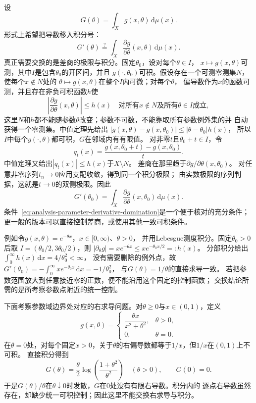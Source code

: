 设
\[   G(\theta)=\int_X g(x,\theta)\,\mathrm{d}\mu(x). \]
形式上希望把导数移入积分号：
\[   G'(\theta)   \stackrel{?}{=}   \int_X\frac{\partial g}{\partial\theta}(x,\theta)\,\mathrm{d}\mu(x). \]
真正需要交换的是差商的极限与积分。固定$\theta_0$，设对每个$\theta\in I$，
$x\mapsto g(x,\theta)$可测，其中$I$是包含$\theta_0$的开区间，并且
$g(\cdot,\theta_0)$可积。假设存在一个可测零测集$N$，使每个$x\notin N$处的
$\theta\mapsto g(x,\theta)$在整个$I$内可微；对每个$\theta$，
偏导数作为$x$的函数可测，并且存在非负可积函数$h$使
\begin{equation}
  \left|
    \frac{\partial g}{\partial\theta}(x,\theta)
  \right|
  \leq h(x)
  \quad
  \text{对所有$x\notin N$及所有$\theta\in I$成立},
\label{eq:analysis-parameter-derivative-domination}
\end{equation}
这里$N$和$h$都不能随参数$\theta$改变；参数不可数，不能靠取所有参数例外集的并
自动获得一个零测集。中值定理先给出
$|g(x,\theta)-g(x,\theta_0)|\leq|\theta-\theta_0|h(x)$，
所以$I$中每个$g(\cdot,\theta)$都可积，$G$在邻域内有有限值。
对非零$t$且$\theta_0+t\in I$，令
\[
 q_t(x)=\frac{g(x,\theta_0+t)-g(x,\theta_0)}{t}.
\]
中值定理又给出$|q_t(x)|\leq h(x)$于$X\setminus N$。
差商在那里趋于$\partial g/\partial\theta(x,\theta_0)$。
对任意非零序列$t_n\to0$应用支配收敛，得到同一个积分极限；
由实数极限的序列判据，这就是$t\to0$的双侧极限。因此
\begin{equation}
  G'(\theta_0)
  =
  \int_X
  \frac{\partial g}{\partial\theta}(x,\theta_0)
  \,\mathrm{d}\mu(x).
\label{eq:analysis-differentiate-under-integral}
\end{equation}
条件~\eqref{eq:analysis-parameter-derivative-domination}是一个便于核对的充分条件； 更一般的版本可以直接控制差商，或使用其他一致可积条件。

例如令$g(x,\theta)=e^{-\theta x}$，$x\in[0,\infty)$、$\theta>0$，
并用Lebesgue测度积分。固定$\theta_0>0$后取
$I=(\theta_0/2,3\theta_0/2)$，则
$|\partial_\theta g|=xe^{-\theta x}\leq xe^{-\theta_0x/2}=:h(x)$。
分部积分给出$\int_0^\infty h(x)\,\mathrm dx=4/\theta_0^2<\infty$，
没有需要删除的例外点，故
$G'(\theta_0)=-\int_0^\infty xe^{-\theta_0x}\,\mathrm dx=-1/\theta_0^2$，
与$G(\theta)=1/\theta$的直接求导一致。
若把参数范围放大到任意接近零的正数，便不能沿用这个固定的控制函数；
交换结论所需的是所考察参数点附近的统一控制。

\begin{example}[参数积分中的控制函数失效]
\label{ex:analysis-parameter-integral-failure}
下面考察参数域边界处对应的右求导问题。对$\theta\geq0$与$x\in(0,1)$，定义
\[   g(x,\theta)   =
\begin{cases}     \dfrac{\theta x}{x^2+\theta^2}, & \theta>0,\\[5pt]     0, & \theta=0.
\end{cases} \]
在$\theta=0$处，对每个固定$x>0$，关于$\theta$的右偏导数都等于$1/x$，但$1/x$在$(0,1)$上不可积。
直接积分得到
\[   G(\theta)   =   \frac{\theta}{2}   \log\left(\frac{1+\theta^2}{\theta^2}\right)   \quad(\theta>0),   \qquad G(0)=0. \]
于是$G(\theta)/\theta$在$\theta\downarrow0$时发散，$G$在$0$处没有有限右导数。积分内的
逐点右导数虽然存在，却缺少统一可积控制；因此这里不能交换右求导与积分。
\end{example}

